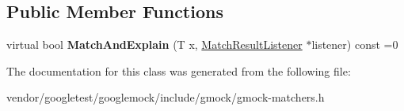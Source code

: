 \subsection*{Public Member Functions}
\begin{DoxyCompactItemize}
\item 
\mbox{\label{classtesting_1_1_matcher_interface_a296b43607cd99d60365f0e6a762777cf}} 
virtual bool {\bfseries Match\+And\+Explain} (T x, \mbox{\hyperlink{classtesting_1_1_match_result_listener}{Match\+Result\+Listener}} $\ast$listener) const =0
\end{DoxyCompactItemize}


The documentation for this class was generated from the following file\+:\begin{DoxyCompactItemize}
\item 
vendor/googletest/googlemock/include/gmock/gmock-\/matchers.\+h\end{DoxyCompactItemize}
